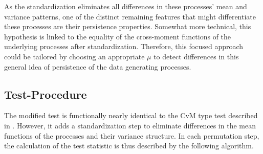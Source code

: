 \documentclass[12pt, a4paper]{article}
\theoremstyle{MAstyle} \newtheorem{assumption}{Assumption}[section]
\theoremstyle{MAstyle} \newtheorem{definition}{Definition}[section]
\theoremstyle{MAstyle} \newtheorem{theorem}{Theorem}[section]
\begin{document}
		As the standardization eliminates all differences in these processes' mean and variance patterns, one of the distinct remaining features that might differentiate these processes are their persistence properties.
		Somewhat more technical, this hypothesis is linked to the equality of the cross-moment functions of the underlying processes after standardization.
		Therefore, this focused approach could be tailored by choosing an appropriate $\mu$ to detect differences in this general idea of persistence of the data generating processes. 
		
		\subsection{Test-Procedure}\label{persistence_test}
		The modified test is functionally nearly identical to the CvM type test described in \cite{bugni_permutation_2021}. However, it adds a standardization step to eliminate differences in the mean functions of the processes and their variance structure. In each permutation step, the calculation of the test statistic is thus described by the following algorithm.\\
		
\end{document}
